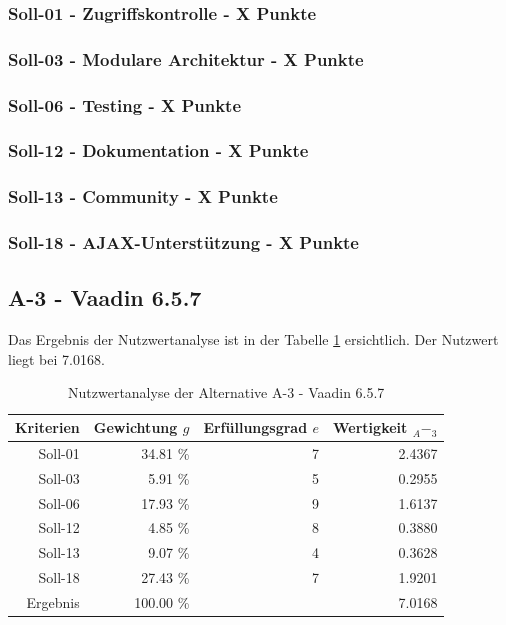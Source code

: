   \subsubsection{Soll-01 - Zugriffskontrolle - X Punkte}
  
  \subsubsection{Soll-03 - Modulare Architektur - X Punkte}
  
  \subsubsection{Soll-06 - Testing - X Punkte}
  
  \subsubsection{Soll-12 - Dokumentation - X Punkte}
  
  \subsubsection{Soll-13 - Community - X Punkte}

  \subsubsection{Soll-18 - AJAX-Unterstützung - X Punkte}
  
  \subsection{A-3 - Vaadin 6.5.7}
  
  Das Ergebnis der Nutzwertanalyse ist in der Tabelle \ref{tab:nwaA3}
  ersichtlich. Der Nutzwert liegt bei 7.0168.
    
  \begin{table}[ht]
    \sffamily 
    \begin{center}
      \begin{tabular}{r|rrr}
        \toprule
        Kriterien & Gewichtung \(g\) & Erfüllungsgrad \(e\) & Wertigkeit
        \(_A-_3\) \\
        \midrule
        Soll-01   & 34.81 \% & 7 & 2.4367 \\
        Soll-03   &  5.91 \% & 5 & 0.2955 \\
        Soll-06   & 17.93 \% & 9 & 1.6137 \\
        Soll-12   &  4.85 \% & 8 & 0.3880 \\
        Soll-13   &  9.07 \% & 4 & 0.3628 \\
        Soll-18   & 27.43 \% & 7 & 1.9201 \\
        \midrule
        \midrule
        Ergebnis  & 100.00 \% &   & 7.0168 \\
        \bottomrule
      \end{tabular}
      \caption{Nutzwertanalyse der Alternative A-3 - Vaadin 6.5.7}
      \label{tab:nwaA3}
    \end{center}
  \end{table}
  
